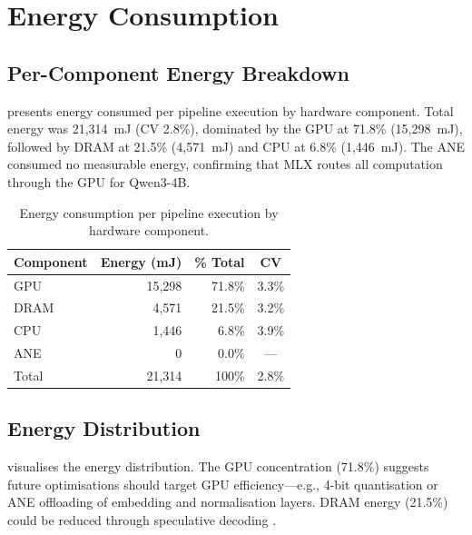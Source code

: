 \section{Energy Consumption}
\label{sec:energy-evaluation}

\subsection{Per-Component Energy Breakdown}
\label{subsec:energy-breakdown}

 presents energy consumed per pipeline execution by hardware component. Total energy was 21,314~mJ (CV 2.8\%), dominated by the GPU at 71.8\% (15,298~mJ), followed by DRAM at 21.5\% (4,571~mJ) and CPU at 6.8\% (1,446~mJ). The ANE consumed no measurable energy, confirming that MLX routes all computation through the GPU for Qwen3-4B.

\begin{table}[htbp]
  \centering
  \caption{Energy consumption per pipeline execution by hardware component.}
  \label{tab:energy-breakdown}
  \begin{tabular}{@{}lrrc@{}}
    \toprule
    \textbf{Component} & \textbf{Energy (mJ)} & \textbf{\% Total} & \textbf{CV} \\
    \midrule
    GPU  & 15,298 & 71.8\% & 3.3\% \\
    DRAM &  4,571 & 21.5\% & 3.2\% \\
    CPU  &  1,446 &  6.8\% & 3.9\% \\
    ANE  &      0 &  0.0\% & ---   \\
    \midrule
    Total & 21,314 & 100\% & 2.8\% \\
    \bottomrule
  \end{tabular}
\end{table}

\subsection{Energy Distribution}
\label{subsec:energy-distribution}

 visualises the energy distribution. The GPU concentration (71.8\%) suggests future optimisations should target GPU efficiency---e.g., 4-bit quantisation or ANE offloading of embedding and normalisation layers. DRAM energy (21.5\%) could be reduced through speculative decoding \cite{xu2024}.

